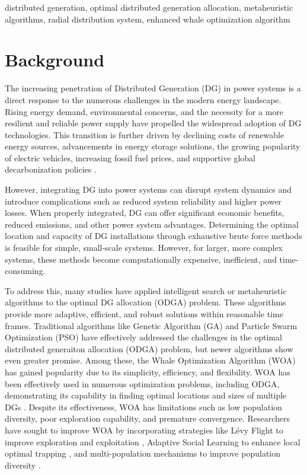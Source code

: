 \documentclass[conference]{IEEEtran}
\begin{document}
\begin{IEEEkeywords}
distributed generation, optimal distributed generation allocation, metaheuristic algorithms, radial distribution system, enhanced whale optimization algorithm


\end{IEEEkeywords}

\section{Background}
The increasing penetration of Distributed Generation (DG) in power systems is a direct response to the numerous challenges in the modern energy landscape. Rising energy demand, environmental concerns, and the necessity for a more resilient and reliable power supply have propelled the widespread adoption of DG technologies. This transition is further driven by declining costs of renewable energy sources, advancements in energy storage solutions, the growing popularity of electric vehicles, increasing fossil fuel prices, and supportive global decarbonization policies \cite{IEA}.

However, integrating DG into power systems can disrupt system dynamics and introduce complications such as reduced system reliability and higher power losses. When properly integrated, DG can offer significant economic benefits, reduced emissions, and other power system advantages. Determining the optimal location and capacity of DG installations through exhaustive brute force methods is feasible for simple, small-scale systems. However, for larger, more complex systems, these methods become computationally expensive, inefficient, and time-consuming.

To address this, many studies have applied intelligent search or metaheuristic algorithms to the optimal DG allocation (ODGA) problem. These algorithms provide more adaptive, efficient, and robust solutions within reasonable time frames. Traditional algorithms like Genetic Algorithm (GA) and Particle Swarm Optimization (PSO) have effectively addressed the challenges in the optimal distributed generaiton allocation (ODGA) problem, but newer algorithms show even greater promise. Among these, the Whale Optimization Algorithm (WOA) has gained popularity due to its simplicity, efficiency, and flexibility. WOA has been effectively used in numerous optimization problems, including ODGA, demonstrating its capability in finding optimal locations and sizes of multiple DGs \cite{WOAreview2}. Despite its effectiveness, WOA has limitations such as low population diversity, poor exploration capability, and premature convergence. Researchers have sought to improve WOA by incorporating strategies like L\'{e}vy Flight to improve exploration and exploitation \cite{Levy Flight}, Adaptive Social Learning to enhance local optimal trapping \cite{Adaptive}, and multi-population mechanisms to improve population diversity \cite{WOAreview}. 
\end{document}
